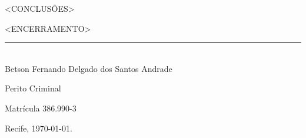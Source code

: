 \documentclass[a4paper,12pt,oneside]{article}
\newcounter{c}
\newcounter{d}
\newcounter{u}
\begin{document}
<CONCLUSÕES>

<ENCERRAMENTO>

\centering


\vspace{75pt}
\bf
\rule{300pt}{1.5pt}\\
Betson Fernando Delgado dos Santos Andrade

Perito Criminal

Matrícula 386.990-3
\vspace{36pt} %

\raggedleft Recife, \today.

\label{pagfim}
\end{document}
